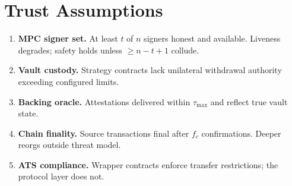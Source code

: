 \section{Trust Assumptions}

\label{sec:trust}

\begin{enumerate}
  \item \textbf{MPC signer set.} At least $t$ of $n$ signers honest and available. Liveness degrades; safety holds unless $\geq n - t + 1$ collude.
  \item \textbf{Vault custody.} Strategy contracts lack unilateral withdrawal authority exceeding configured limits.
  \item \textbf{Backing oracle.} Attestations delivered within $\tau_{\max}$ and reflect true vault state.
  \item \textbf{Chain finality.} Source transactions final after $f_c$ confirmations. Deeper reorgs outside threat model.
  \item \textbf{ATS compliance.} Wrapper contracts enforce transfer restrictions; the protocol layer does not.
\end{enumerate}


